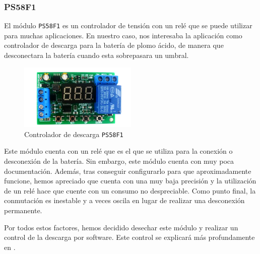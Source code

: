 \subsubsection{PS58F1}

El módulo \texttt{PS58F1} es un controlador de tensión con un relé que se puede utilizar para muchas aplicaciones. En nuestro caso, nos interesaba la aplicación como controlador de descarga para la batería de plomo ácido, de manera que desconectara la batería cuando esta sobrepasara un umbral.

\begin{figure}[H]
    \centering
    \includegraphics[width=0.5\textwidth]{images/2-hardware/componentes/PS58F1.png}
    \caption{Controlador de descarga \texttt{PS58F1}}
    \label{fig:hardware/modulos/controlador_descarga}
\end{figure}

Este módulo cuenta con un relé que es el que se utiliza para la conexión o desconexión de la batería. Sin embargo, este módulo cuenta con muy poca documentación. Además, tras conseguir configurarlo para que aproximadamente funcione, hemos apreciado que cuenta con una muy baja precisión y la utilización de un relé hace que cuente con un consumo no despreciable. Como punto final, la conmutación es inestable y a veces oscila en lugar de realizar una desconexión permanente.

Por todos estos factores, hemos decidido desechar este módulo y realizar un control de la descarga por software. Este control se explicará más profundamente en . 